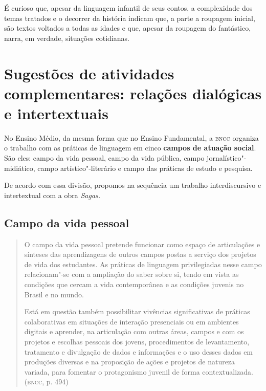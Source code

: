 \documentclass[12pt]{extarticle}
\begin{document}
É curioso que, apesar da linguagem infantil de seus contos, a
complexidade dos temas tratados e o decorrer da história indicam que, a
parte a roupagem inicial, são textos voltados a todas as idades e que,
apesar da roupagem do fantástico, narra, em verdade, situações
cotidianas.

\section{Sugestões de atividades complementares: relações dialógicas e
intertextuais}


No Ensino Médio, da mesma forma que no Ensino Fundamental, a \textsc{bncc}
organiza o trabalho com as práticas de linguagem em cinco \textbf{campos
de atuação social}. São eles: campo da vida pessoal, campo da vida
pública, campo jornalístico"-midiático, campo artístico"-literário e campo
das práticas de estudo e pesquisa.

De acordo com essa divisão, propomos na sequência um trabalho
interdiscursivo e intertextual com a obra \emph{Sagas.}



\subsection{Campo da vida pessoal}

\begin{quote}
O campo da vida pessoal pretende funcionar como espaço de articulações
e sínteses das aprendizagens de outros campos postas a serviço dos
projetos de vida dos estudantes. As práticas de linguagem privilegiadas
nesse campo relacionam"-se com a ampliação do saber sobre si, tendo em
vista as condições que cercam a vida contemporânea e as condições
juvenis no Brasil e no mundo.

Está em questão também possibilitar vivências significativas de práticas
colaborativas em situações de interação presenciais ou em ambientes
digitais e aprender, na articulação com outras áreas, campos e com os
projetos e escolhas pessoais dos jovens, procedimentos de levantamento,
tratamento e divulgação de dados e informações e o uso desses dados em
produções diversas e na proposição de ações e projetos de natureza
variada, para fomentar o protagonismo juvenil de forma
contextualizada. (\textsc{bncc}, p. 494)
\end{quote}
\end{document}

